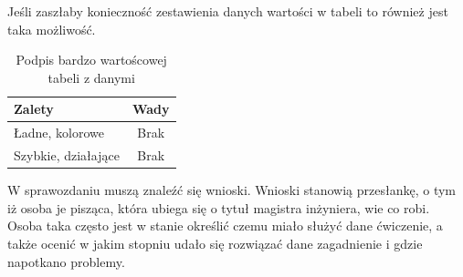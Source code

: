 \documentclass[a4paper,12pt]{article}
\begin{document}
Jeśli zaszłaby konieczność zestawienia danych wartości w tabeli to również jest taka możliwość.

\begin{table}[!hbp]
\centering
\begin{tabular}{|p{5cm}|c|}
\hline 
Zalety & Wady \tabularnewline
\hline 
 Ładne, kolorowe & Brak\tabularnewline
 Szybkie, działające & Brak\tabularnewline
\hline
\end{tabular}
\caption{Podpis bardzo wartoścowej tabeli z danymi}
\end{table}


W sprawozdaniu muszą znaleźć się wnioski. Wnioski stanowią przesłankę, o tym iż osoba je pisząca, która ubiega się o tytuł magistra inżyniera, wie co robi. Osoba taka często jest w stanie określić czemu miało służyć dane ćwiczenie, a także ocenić w jakim stopniu udało się rozwiązać dane zagadnienie i gdzie napotkano problemy.
\end{document}
